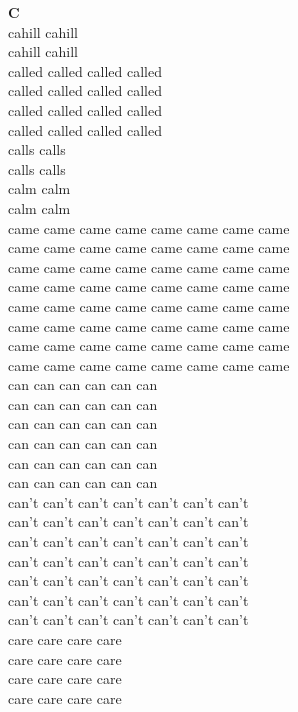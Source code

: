 \vspace{14pt}
\noindent\textbf{\Large C}\\[+12pt]
cahill cahill\\
cahill cahill\\
called called called called\\
called called called called\\
called called called called\\
called called called called\\
calls calls\\
calls calls\\
calm calm\\
calm calm\\
came came came came came came came came\\
came came came came came came came came\\
came came came came came came came came\\
came came came came came came came came\\
came came came came came came came came\\
came came came came came came came came\\
came came came came came came came came\\
came came came came came came came came\\
can can can can can can\\
can can can can can can\\
can can can can can can\\
can can can can can can\\
can can can can can can\\
can can can can can can\\
can't can't can't can't can't can't can't\\
can't can't can't can't can't can't can't\\
can't can't can't can't can't can't can't\\
can't can't can't can't can't can't can't\\
can't can't can't can't can't can't can't\\
can't can't can't can't can't can't can't\\
can't can't can't can't can't can't can't\\
care care care care\\
care care care care\\
care care care care\\
care care care care\\

